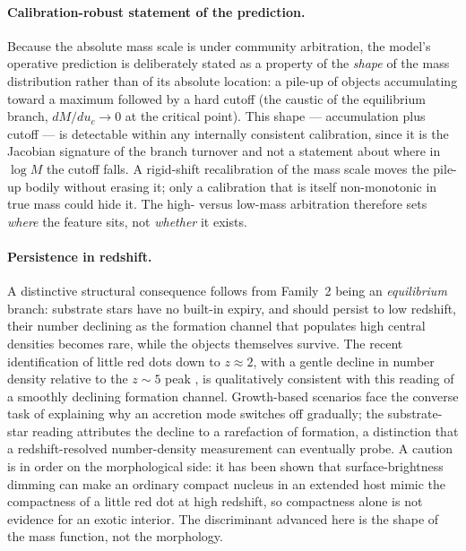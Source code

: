 \documentclass[11pt,a4paper]{article}
\theoremstyle{plain}
\theoremstyle{remark}
\begin{document}
\paragraph{Calibration-robust statement of the prediction.} Because the absolute mass scale is under community arbitration, the model's operative prediction is deliberately stated as a property of the \emph{shape} of the mass distribution rather than of its absolute location: a pile-up of objects accumulating toward a maximum followed by a hard cutoff (the caustic of the equilibrium branch, $dM/du_c \to 0$ at the critical point). This shape --- accumulation plus cutoff --- is detectable within any internally consistent calibration, since it is the Jacobian signature of the branch turnover and not a statement about where in $\log M$ the cutoff falls. A rigid-shift recalibration of the mass scale moves the pile-up bodily without erasing it; only a calibration that is itself non-monotonic in true mass could hide it. The high- versus low-mass arbitration therefore sets \emph{where} the feature sits, not \emph{whether} it exists.

\paragraph{Persistence in redshift.} A distinctive structural consequence follows from Family~2 being an \emph{equilibrium} branch: substrate stars have no built-in expiry, and should persist to low redshift, their number declining as the formation channel that populates high central densities becomes rare, while the objects themselves survive. The recent identification of little red dots down to $z \approx 2$, with a gentle decline in number density relative to the $z \sim 5$ peak \cite{kapoor2026}, is qualitatively consistent with this reading of a smoothly declining formation channel. Growth-based scenarios face the converse task of explaining why an accretion mode switches off gradually; the substrate-star reading attributes the decline to a rarefaction of formation, a distinction that a redshift-resolved number-density measurement can eventually probe. A caution is in order on the morphological side: it has been shown that surface-brightness dimming can make an ordinary compact nucleus in an extended host mimic the compactness of a little red dot at high redshift, so compactness alone is not evidence for an exotic interior. The discriminant advanced here is the shape of the mass function, not the morphology.
\end{document}
